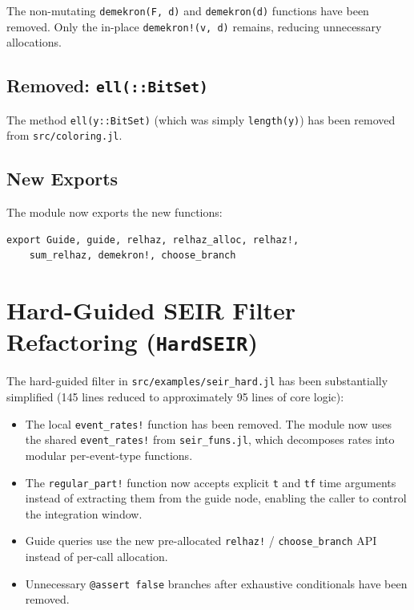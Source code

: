 \documentclass[11pt,letterpaper]{article}
\begin{document}
The non-mutating \texttt{demekron(F, d)} and \texttt{demekron(d)}
functions have been removed. Only the in-place \texttt{demekron!(v, d)}
remains, reducing unnecessary allocations.

\subsection{Removed: \texttt{ell(::BitSet)}}

The method \texttt{ell(y::BitSet)} (which was simply
\texttt{length(y)}) has been removed from \texttt{src/coloring.jl}.

\subsection{New Exports}

The module now exports the new functions:

\begin{verbatim}
export Guide, guide, relhaz, relhaz_alloc, relhaz!,
    sum_relhaz, demekron!, choose_branch
\end{verbatim}

\section{Hard-Guided SEIR Filter Refactoring (\texttt{HardSEIR})}

The hard-guided filter in \texttt{src/examples/seir\_hard.jl} has been
substantially simplified (145 lines reduced to approximately 95 lines
of core logic):

\begin{itemize}
  \item The local \texttt{event\_rates!} function has been removed.
        The module now uses the shared \texttt{event\_rates!} from
        \texttt{seir\_funs.jl}, which decomposes rates into
        modular per-event-type functions.
  \item The \texttt{regular\_part!} function now accepts explicit
        \texttt{t} and \texttt{tf} time arguments instead of
        extracting them from the guide node, enabling the caller to
        control the integration window.
  \item Guide queries use the new pre-allocated \texttt{relhaz!} /
        \texttt{choose\_branch} API instead of per-call allocation.
  \item Unnecessary \texttt{@assert false} branches after exhaustive
        conditionals have been removed.
\end{itemize}
\end{document}
